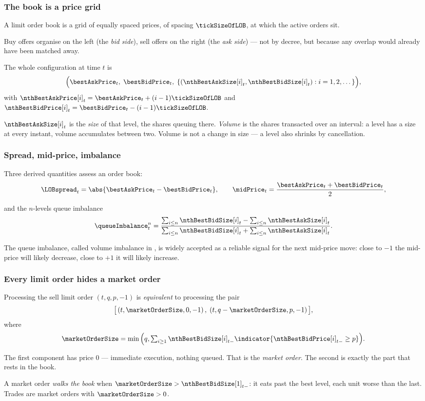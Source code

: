 \begin{frame}
  \frametitle{The book is a price grid}
A limit order book is a grid of equally spaced prices, of spacing $\tickSizeOfLOB$,
at which the active orders sit.

\pause

Buy offers organise on the left (the \emph{bid side}),
sell offers on the right (the \emph{ask side}) ---
not by decree, but because any overlap would already have been matched away.

\pause

The whole configuration at time $t$ is
\[
\Big(\bestAskPrice_t, \; \bestBidPrice_t, \;
\lbrace (\nthBestAskSize[i]_t, \nthBestBidSize[i]_t) : i=1,2,\dots \rbrace \Big),
\]
with $\nthBestAskPrice[i]_t = \bestAskPrice_t + (i-1)\tickSizeOfLOB$
and $\nthBestBidPrice[i]_t = \bestBidPrice_t - (i-1)\tickSizeOfLOB$.

\pause

$\nthBestAskSize[i]_t$ is the \emph{size} of that level, the shares queuing there.
\emph{Volume} is the shares transacted over an interval:
a level has a size at every instant, volume accumulates between two.
Volume is not a change in size --- a level also shrinks by cancellation.
\end{frame}

\begin{frame}
  \frametitle{Spread, mid-price, imbalance}
Three derived quantities assess an order book:
\[
\LOBspread_t = \abs{\bestAskPrice_t - \bestBidPrice_t},
\qquad
\midPrice_t = \frac{\bestAskPrice_t + \bestBidPrice_t}{2},
\]

\pause

and the $n$-levels queue imbalance
\[
\queueImbalance^{n}_t =
\frac{\sum_{i\leq n}\nthBestBidSize[i]_t - \sum_{i\leq n}\nthBestAskSize[i]_t}{\sum_{i\leq n}\nthBestBidSize[i]_t + \sum_{i\leq n}\nthBestAskSize[i]_t}.
\]

\pause

The queue imbalance, called volume imbalance in \citet{CDJ18enh},
is widely accepted as a reliable signal for the next mid-price move:
close to $-1$ the mid-price will likely decrease, close to $+1$ it will likely increase.
\end{frame}

\begin{frame}
  \frametitle{Every limit order hides a market order}
Processing the sell limit order $(t,q,p,-1)$ is \emph{equivalent} to processing the pair
\[
\big[\,(t,\marketOrderSize,0,-1)\,,\;(t,q-\marketOrderSize,p,-1)\,\big],
\]
where
\[
\marketOrderSize = \min\Big(q, \textstyle\sum_{i\geq 1} \nthBestBidSize[i]_{t-} \indicator{\nthBestBidPrice[i]_{t-}\geq p}\Big).
\]

\pause

The first component has price $0$ --- immediate execution, nothing queued.
That is the \emph{market order}.
The second is exactly the part that rests in the book.

\pause

A market order \emph{walks the book} when $\marketOrderSize > \nthBestBidSize[1]_{t-}$:
it eats past the best level, each unit worse than the last.
Trades are market orders with $\marketOrderSize > 0$.
\end{frame}

